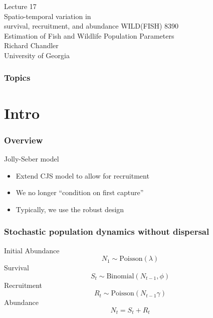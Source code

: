 \documentclass[color=usenames,dvipsnames]{beamer}\usepackage[]{graphicx}\usepackage[]{color}
\begin{document}
\begin{frame}[plain]
  \centering
  \LARGE
  Lecture 17 \\ Spatio-temporal variation in \\
  survival, recruitment, and abundance %
  \vfill
  \large
  WILD(FISH) 8390 \\
  Estimation of Fish and Wildlife Population Parameters \\
  \vfill
  Richard Chandler \\
  University of Georgia \\
\end{frame}







\begin{frame}[plain]
  \frametitle{Topics}
  \Large
\end{frame}




\section{Intro}






\begin{frame}
  \frametitle{Overview}
  \large
  {Jolly-Seber model}
  \begin{itemize}
    \item Extend CJS model to allow for recruitment
    \item We no longer ``condition on first capture''
    \item Typically, we use the robust design
  \end{itemize}
\end{frame}




\begin{frame}
  \frametitle{\large Stochastic population dynamics without dispersal}
  {Initial Abundance}
  \[
    N_1 \sim \mbox{Poisson}(\lambda)
  \]
  \vfill
  {Survival}
  \[
    S_t \sim \mbox{Binomial}(N_{t-1}, \phi)
  \]
  \vfill
  {Recruitment}
  \[
    R_t \sim \mbox{Poisson}(N_{t-1} \gamma)
  \]
  \vfill
  {Abundance}
  \[
    N_t = S_t + R_t
  \]
\end{frame}
\end{document}
